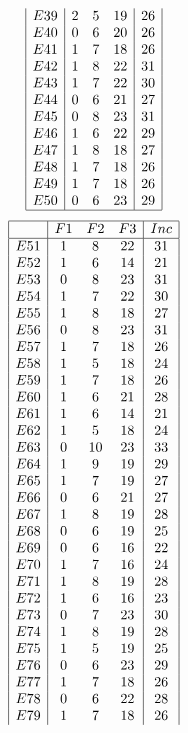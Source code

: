 \documentclass[12pt]{article}
\begin{document}
\begin{multicols}{3}
\begin{equation*}
\begin{array}{|c|ccc|c|}
E39&2&5&19&26\\
E40&0&6&20&26\\
E41&1&7&18&26\\
E42&1&8&22&31\\
E43&1&7&22&30\\
E44&0&6&21&27\\
E45&0&8&23&31\\
E46&1&6&22&29\\
E47&1&8&18&27\\
E48&1&7&18&26\\
E49&1&7&18&26\\
E50&0&6&23&29\\
\hline
\end{array}
\end{equation*}
\begin{equation*}
\begin{array}{|c|ccc|c|}
\hline
&F1&F2&F3&Inc\\
\hline
E51&1&8&22&31\\
E52&1&6&14&21\\
E53&0&8&23&31\\
E54&1&7&22&30\\
E55&1&8&18&27\\
E56&0&8&23&31\\
E57&1&7&18&26\\
E58&1&5&18&24\\
E59&1&7&18&26\\
E60&1&6&21&28\\
E61&1&6&14&21\\
E62&1&5&18&24\\
E63&0&10&23&33\\
E64&1&9&19&29\\
E65&1&7&19&27\\
E66&0&6&21&27\\
E67&1&8&19&28\\
E68&0&6&19&25\\
E69&0&6&16&22\\
E70&1&7&16&24\\
E71&1&8&19&28\\
E72&1&6&16&23\\
E73&0&7&23&30\\
E74&1&8&19&28\\
E75&1&5&19&25\\
E76&0&6&23&29\\
E77&1&7&18&26\\
E78&0&6&22&28\\
E79&1&7&18&26\\

\end{array}
\end{equation*}
\end{multicols}
\end{document}
